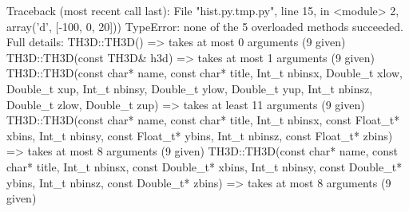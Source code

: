 \begin{footnotesize}
\begin{pyglist}[language=text,texcl=true,abovecaptionskip=0,style=bw]
Traceback (most recent call last):
  File "hist.py.tmp.py", line 15, in <module>
    2, array('d', [-100, 0, 20]))
TypeError: none of the 5 overloaded methods succeeded. Full details:
  TH3D::TH3D() =>
    takes at most 0 arguments (9 given)
  TH3D::TH3D(const TH3D& h3d) =>
    takes at most 1 arguments (9 given)
  TH3D::TH3D(const char* name, const char* title, Int_t nbinsx, Double_t xlow, Double_t xup, Int_t nbinsy, Double_t ylow, Double_t yup, Int_t nbinsz, Double_t zlow, Double_t zup) =>
    takes at least 11 arguments (9 given)
  TH3D::TH3D(const char* name, const char* title, Int_t nbinsx, const Float_t* xbins, Int_t nbinsy, const Float_t* ybins, Int_t nbinsz, const Float_t* zbins) =>
    takes at most 8 arguments (9 given)
  TH3D::TH3D(const char* name, const char* title, Int_t nbinsx, const Double_t* xbins, Int_t nbinsy, const Double_t* ybins, Int_t nbinsz, const Double_t* zbins) =>
    takes at most 8 arguments (9 given)
\end{pyglist}
\end{footnotesize}
